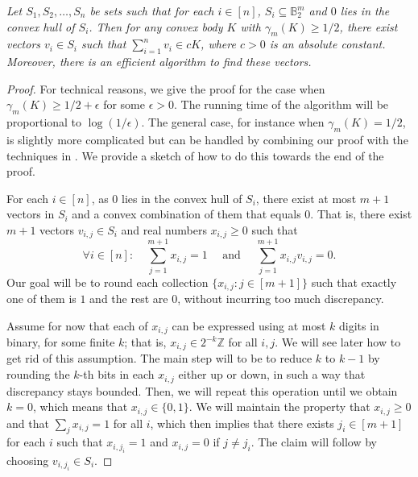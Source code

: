 \documentclass[11pt]{article}
\numberwithin{equation}{section}
\theoremstyle{definition}
\theoremstyle{plain}
\newcommand{\expref}[2]{\hyperref[#2]{#1~\ref{#2}}}
\begin{document}
\noindent{\bf \expref{Theorem}{thm:genbana} (restated).} \emph{Let $S_1,S_2,\dots,S_n$  be sets such that for each $i\in [n]$, $S_i \subseteq \mathbb{B}_2^m$ and $0$ lies in the convex hull of $S_i$. Then for any convex body $K$ with $\gamma_m(K)\ge 1/2$, there exist vectors $v_i\in S_i$ such that
$\sum_{i=1}^n v_i \in cK$,
where $c>0$ is an absolute constant. Moreover, there is an efficient algorithm to find these vectors.
}
\begin{proof}
For technical reasons, we give the proof for the case when $\gamma_m(K)\ge 1/2+\epsilon$ for some $\epsilon>0$. The running time of the algorithm will be proportional to $\log(1/\epsilon)$. The general case, for instance when $\gamma_m(K)=1/2$, is slightly more complicated but can be handled by combining our proof with the techniques in \cite{DGLN16}. We provide a sketch of how to do this towards the end of the proof.

For each $i\in [n]$, as $0$ lies in the convex hull of $S_i$, there exist at most $m+1$ vectors in $S_i$ and a convex combination of them that equals $0$.
That is, there exist $m+1$ vectors $v_{i,j}\in S_i$ and real numbers $x_{i,j}\ge0$ such that
\begin{equation}
\label{eqn:genbana2}
\forall i \in [n]: \quad \sum_{j=1}^{m+1} x_{i,j}=1 \quad\text{ and }\quad\sum_{j=1}^{m+1} x_{i,j}v_{i,j}=0.
\end{equation}
Our goal will be to round each collection $\{x_{i,j}: j \in [m+1]\}$ such that exactly one of them is $1$ and the rest are $0$, without incurring too much discrepancy.

Assume for now that each of $x_{i,j}$ can be expressed using at most $k$ digits in binary, for some finite $k$; that is, $x_{i,j} \in 2^{-k}\mathbb{Z}$ for all $i,j$.
We will see later how to get rid of this assumption. The main step will to be to reduce $k$ to $k-1$ by rounding the $k$-th bits in each $x_{i,j}$ either up or down,
in such a way that discrepancy stays bounded. Then, we will repeat this operation until we obtain $k=0$, which means that $x_{i,j} \in \{0,1\}$.
We will maintain the property that $x_{i,j} \ge 0$ and that $\sum_j x_{i,j}=1$ for all $i$, which then implies that there exists $j_{i} \in [m+1]$ for each $i$ such that $x_{i,j_i}=1$
and $x_{i,j}=0$ if $j \ne j_i$. The claim will follow by choosing $v_{i,j_i} \in S_i$.



\end{proof}
\end{document}

